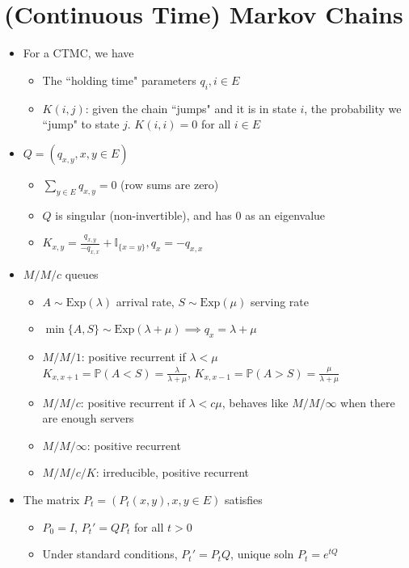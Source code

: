 \section{(Continuous Time) Markov Chains}
\begin{itemize}
    \item For a CTMC, we have
    \begin{itemize}
        \item The ``holding time" parameters $q_i, i \in E$
        \item $K(i,j)$: given the chain ``jumps" and it is in state $i$, the probability we ``jump" to state $j$. $K(i,i) = 0$ for all $i \in E$
    \end{itemize}
    \item $Q = (q_{x,y}, x, y \in E)$
    \begin{itemize}
        \item $\sum_{y\in E} q_{x,y} = 0$ (row sums are zero)
        \item $Q$ is singular (non-invertible), and has $0$ as an eigenvalue
        \item $K_{x,y} = \frac{q_{x,y}}{-q_{x,x}} + \mathbb{I}_{\{x=y\}}, q_x = -q_{x,x}$
    \end{itemize}
    \item $M/M/c$ queues
    \begin{itemize}
        \item $A \sim \text{Exp}(\lambda)$ arrival rate, $S \sim \text{Exp}(\mu)$ serving rate
        \item $\min\{A,S\} \sim \text{Exp}(\lambda + \mu) \implies q_x = \lambda + \mu$
        \item $M/M/1$: positive recurrent if $\lambda < \mu$ \\ $K_{x,x+1} = \mathbb{P}(A < S) = \frac{\lambda}{\lambda + \mu}$, $K_{x,x-1} = \mathbb{P}(A > S) = \frac{\mu}{\lambda + \mu}$
        \item $M/M/c$: positive recurrent if $\lambda < c\mu$, behaves like $M/M/\infty$ when there are enough servers
        \item $M/M/\infty$: positive recurrent
        \item $M/M/c/K$: irreducible, positive recurrent
    \end{itemize}
    \item The matrix $P_t = (P_t(x,y), x,y \in E)$ satisfies
    \begin{itemize}
        \item $P_0 = I$, $P_t' = QP_t$ for all $t > 0$
        \item Under standard conditions, $P_t' = P_tQ$, unique soln $P_t = e^{tQ}$

\end{itemize}
\end{itemize}
